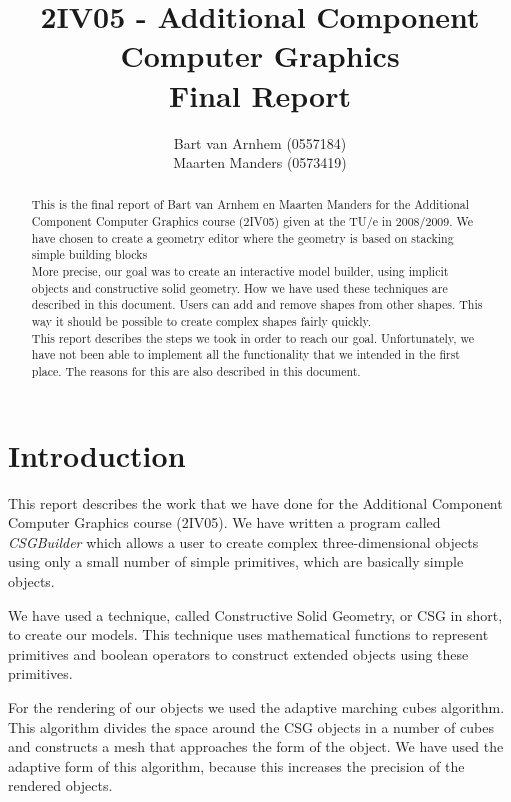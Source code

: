 \documentclass[a4wide,10pt,twocolumn]{article}
\title{2IV05 - Additional Component Computer Graphics \\ Final Report}
\author{Bart van Arnhem (0557184) \\ Maarten Manders (0573419)}
\begin{document}
\maketitle
\thispagestyle{empty}

\onecolumn
\begin{abstract}
    This is the final report of Bart van Arnhem en Maarten Manders for the Additional Component Computer Graphics course (2IV05) given at the TU/e in 2008/2009. We have chosen to create a geometry editor where the geometry is based on stacking simple building blocks\\
      
    More precise, our goal was to create an interactive model builder, using implicit objects and constructive solid geometry. How we have used these techniques are described in this document. Users can add and remove shapes from other shapes. This way it should be possible to create complex shapes fairly quickly.\\
    
    This report describes the steps we took in order to reach our goal. Unfortunately, we have not been able to implement all the functionality that we intended in the first place. The reasons for this are also described in this document.
\end{abstract}
\thispagestyle{empty}
\clearpage

\tableofcontents
\setcounter{page}{1}
\twocolumn
\section{Introduction}
This report describes the work that we have done for the Additional Component Computer Graphics course (2IV05). We have written a program called \emph{CSGBuilder} which allows a user to create complex three-dimensional objects using only a small number of simple primitives, which are basically simple objects.

We have used a technique, called Constructive Solid Geometry, or CSG in short, to create our models. This technique uses mathematical functions to represent primitives and boolean operators to construct extended objects using these primitives.

For the rendering of our objects we used the adaptive marching cubes algorithm. This algorithm divides the space around the CSG objects in a number of cubes and constructs a mesh that approaches the form of the object. We have used the adaptive form of this algorithm, because this increases the precision of the rendered objects.
\end{document}
